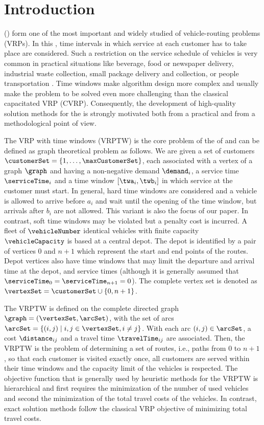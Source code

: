 \documentclass[11pt,a4paper,fleqn]{article}
\begin{document}
\section{Introduction}
\label{sec:introduction}
\problemClassCapital (\problemClassShortS) form one of the most important and widely studied \families of vehicle-routing problems (VRPs). In this \family, time intervals in which service at each customer has to take place are considered. Such a restriction on the service schedule of vehicles is very common in practical situations like beverage, food  or newspaper delivery, industrial waste collection, small package delivery and collection, or people transportation \citep[see, e.g.,][]{TotV14}. Time windows make algorithm design more complex and usually make the problem to be solved even more challenging than the classical capacitated VRP (CVRP). Consequently, the development of high-quality solution methods for the \problemClassShort \family is strongly motivated both from a practical and from a methodological point of view.

The VRP with time windows (VRPTW) is the core problem of the \family of \problemClassShortS and can be defined as graph theoretical problem as follows. We are given a set of customers $\customerSet=\{1, \dots, \maxCustomerSet\}$, each associated with a vertex of a graph $\graph$ and having a non-negative demand $\demand_i$, a service time $\serviceTime_i$ and a time window $[\twa_i,\twb_i]$ in which service at the customer must start. In general, hard time windows are considered and a vehicle is allowed to arrive before $a_i$ and wait until the opening of the time window, but arrivals after $b_i$ are not allowed. This variant is also the focus of our paper. In contrast, soft time windows may be violated but a penalty cost is incurred. A fleet of  $\vehicleNumber$ identical vehicles with finite capacity $\vehicleCapacity$ is based at a central depot. The depot is identified by a pair of vertices $0$ and $n+1$ which represent the start and end points of the routes. Depot vertices also have time windows that may limit the departure and arrival time at the depot, and service times (although it is generally assumed that $\serviceTime_0=\serviceTime_{n+1}=0$). The complete vertex set is denoted as $\vertexSet= \customerSet \cup \{0,n+1\}$.

The VRPTW is defined on the complete directed graph $\graph=(\vertexSet,\arcSet)$, with the set of arcs $\arcSet=\{(i,j)\mid i,j \in \vertexSet,i \neq j\}$. With each arc $(i,j) \in \arcSet$, a cost $\distance_{ij}$ and a travel time $\travelTime_{ij}$ are associated. Then, the VRPTW is the problem of determining a set of routes, i.e., paths from $0$ to $n+1$, so that each customer is visited exactly once, all customers are served within their time windows and the capacity limit of the vehicles is respected. The objective function that is generally used by heuristic methods for the VRPTW is hierarchical and first requires the minimization of the number of used vehicles and second the minimization of the total travel costs of the vehicles. In contrast, exact solution methods follow the classical VRP objective of minimizing total travel costs.
\end{document}
